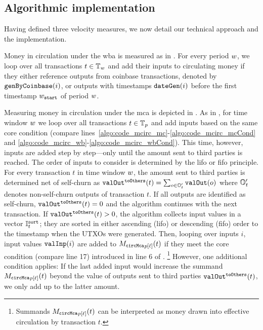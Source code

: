 \subsection{Algorithmic implementation}
\label{sec:cc_money_seg:sub:mcirc_pract}%
Having defined three velocity measures, we now detail our technical approach
and the implementation.

Money in circulation under the \ac{wba} is measured as in
.  %
For every period ${w}$, we loop over all transactions $t\in{\mathbb{T}_{w}}$ and add
their inputs to circulating money if they either reference outputs from
coinbase transactions, denoted by ${\mathtt{genByCoinbase}}(i)$, or outputs with
timestamps ${\mathtt{dateGen}}(i)$ before the first timestamp ${w}_{\mathtt{start}}$ of period
${w}$.  %
%
%
%

Measuring money in circulation under the \ac{mca} is depicted in
.  %
%
As in , for time window ${w}$ we loop over all
transactions $t\in{\mathbb{T}_{p}}$ and add inputs based on the same core condition
(compare lines~\ref{algo:code_mcirc_mc}-\ref{algo:code_mcirc_mcCond} and
\ref{algo:code_mcirc_wb}-\ref{algo:code_mcirc_wbCond}).  %
This time, however, inputs are added step by step---only until the amount
sent to third parties is reached.  %
The order of inputs to consider is determined by the \ac{lifo} or \ac{fifo}
principle.  %
For every transaction $t$ in time window ${w}$, the amount sent to third
parties is determined net of self-churn as
${\mathtt{valOut}}^{\mathtt{toOthers}}(t) = \sum_{o\in{}{\mathbb{O}}'_{t}} {\mathtt{valOut}}(o)$ %
where ${\mathbb{O}}'_{t}$ denotes non-self-churn outputs of transaction $t$.  %
If all outputs are identified as self-churn, ${\mathtt{valOut}}^{\mathtt{toOthers}}(t) = 0$ and
the algorithm continues with the next transaction.  %
%
If ${\mathtt{valOut}}^{\mathtt{toOthers}}(t) > 0$, the algorithm collects input values in a
vector ${\mathbb{I}^{\mathtt{sort}}_{t}}$; they are sorted in either ascending (\ac{lifo}) or
descending (\ac{fifo}) order \wrt to the timestamp when the UTXOs were
generated.  %
Then, looping over inputs $i$, input values ${\mathtt{valInp}}(i)$ are added to
${{M_{\mathtt{circMca}}}_{{p}[{\ell}]}}(t)$ if they meet the core condition (compare line 17) introduced
in line 6 of .  %
\footnote{Summands ${{M_{\mathtt{circMca}}}_{{p}[{\ell}]}}(t)$ can be interpreted as money drawn into
  effective circulation by transaction $t$.} %
However, one additional condition applies: If the last added input would
increase the summand ${{M_{\mathtt{circMca}}}_{{p}[{\ell}]}}(t)$ beyond the value of outputs sent to
third parties ${\mathtt{valOut}}^{\mathtt{toOthers}}(t)$, we only add up to the latter
amount.  %

